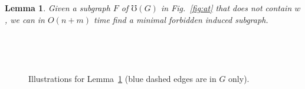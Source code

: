\documentclass[10pt]{article}
\newtheorem{lemma}[theorem]{Lemma}
\newcommand{\badgraph}{minimal forbidden induced subgraph}
\begin{document}
\begin{lemma}\label{lem:at-no-w}
  Given a subgraph $F$ of $\mho(G)$ in Fig.~\ref{fig:at} that does not
  contain $w$, we can in $O(n+m)$ time find a \badgraph.
\end{lemma}
\begin{figure}[h]
  \centering
  \footnotesize
  $\qquad$
  $\qquad$

  $\quad$
  $\quad$
  $\quad$
  \caption{Illustrations for Lemma~\ref{lem:at-no-w} (blue dashed
    edges are in $G$ only).}
\label{fig:negative-certificate-1}
\end{figure}
\end{document}
